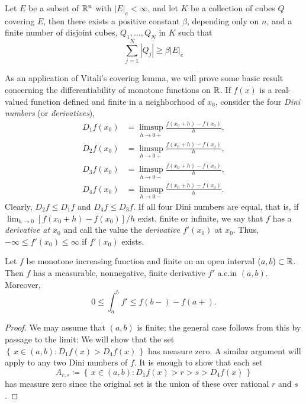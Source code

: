 \begin{theorem}
Let $E$ be a subset of $\mathbb{R}^n$ with $|E|_e<\infty$, and let $K$ be a
collection of cubes $Q$ covering $E$, then there exists a positive constant
$\beta$, depending only on $n$, and a finite number of disjoint cubes,
$Q_1,\dotsc,Q_N$ in $K$ such that
\[
\sum_{j=1}^N|Q_j|\geq\beta|E|_e
\]
\end{theorem}

As an application of Vitali's covering lemma, we will prove some basic
result concerning the differentiability of monotone functions on $\mathbb{R}$. If
$f(x)$ is a real-valued function defined and finite in a neighborhood of
$x_0$, consider the four \emph{Dini numbers} (or \emph{derivatives}),
\[
\begin{aligned}
D_1f(x_0)&=\limsup_{h\to 0+}\frac{f(x_0+h)-f(x_0)}{h},\\
D_2f(x_0)&=\limsup_{h\to 0+}\frac{f(x_0+h)-f(x_0)}{h},\\
D_3f(x_0)&=\limsup_{h\to 0-}\frac{f(x_0+h)-f(x_0)}{h},\\
D_4f(x_0)&=\limsup_{h\to 0-}\frac{f(x_0+h)-f(x_0)}{h}.
\end{aligned}
\]
Clearly, $D_2f\leq D_1f$ and $D_4f\leq D_3f$. If all four Dini numbers are
equal, that is, if $\lim_{h\to 0}[f(x_0+h)-f(x_0)]/h$ exist, finite or
infinite, we say that $f$ has a \emph{derivative at $x_0$} and call the
value the \emph{derivative $f'(x_0)$} at $x_0$. Thus, $-\infty\leq
f'(x_0)\leq\infty$ if $f'(x_0)$ exists.
\begin{theorem}[7.21]
Let $f$ be monotone increasing function and finite on an open interval
$(a,b)\subset\mathbb{R}$. Then $f$ has a measurable, nonnegative, finite
derivative $f'$ a.e.\@ in $(a,b)$. Moreover,
\[
0\leq\int_a^b f'\leq f(b-)-f(a+).
\]
\end{theorem}
\begin{proof}
We may assume that $(a,b)$ is finite; the general case follows from this by
passage to the limit: We will show that the set
$\left\{\,x\in(a,b):D_1f(x)>D_4f(x)\,\right\}$ has measure zero. A similar
argument will apply to any two Dini numbers of $f$. It is enough to show
that each set
\[
A_{r,s}\coloneqq\left\{\,x\in(a,b):D_1f(x)>r>s>D_4f(x)\,\right\}
\]
has measure zero since the original set is the union of these over rational
$r$ and $s$.
\end{proof}

